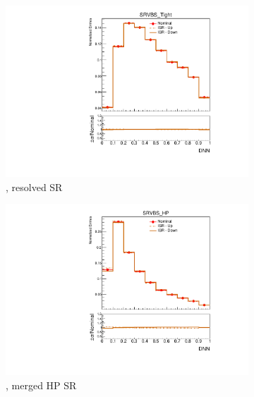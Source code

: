 \begin{figure}[htp]
    \centering
    \begin{subfigure}[b]{0.3\textwidth}
        \includegraphics[width=\textwidth]{figures/1lep/PDFUnc/ISR/ttbar_0ptag2pjet_0ptv_SRVBS_Tight_DNN_SysTheoryISR_ttbar__1up_Norm.pdf}
        \caption{\ttbar, resolved SR}
    \end{subfigure}
    \begin{subfigure}[b]{0.3\textwidth}
        \includegraphics[width=\textwidth]{figures/1lep/PDFUnc/ISR/ttbar_0ptag1pfat0pjet_0ptv_SRVBS_HP_DNN_SysTheoryISR_ttbar__1up_Norm.pdf}
        \caption{\ttbar, merged HP SR}
    \end{subfigure}
    \begin{subfigure}[b]{0.3\textwidth}

\end{subfigure}
\end{figure}
